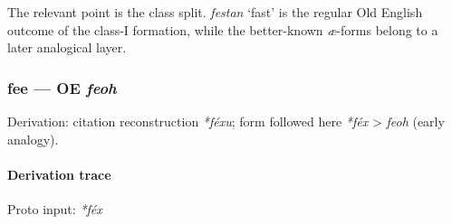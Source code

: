 \documentclass[
  british,
  a4paper,
]{article}
\begin{document}
The relevant point is the class split. {\emph{festan}} `fast' is the
regular Old English outcome of the class-I formation, while the
better-known \emph{æ}-forms belong to a later analogical layer.

\subsubsection{\texorpdfstring{fee --- OE
\emph{feoh}}{fee --- OE feoh}}\label{fee-oe-feoh}

Derivation: citation reconstruction \emph{*féxu}; form followed here
\emph{*féx} \textgreater{} \emph{feoh} (early analogy).

\paragraph{Derivation trace}\label{derivation-trace-117}

Proto input: \emph{*féx}

\begingroup
\setlength{\fboxsep}{6pt}

\noindent{} \endgroup
\end{document}
